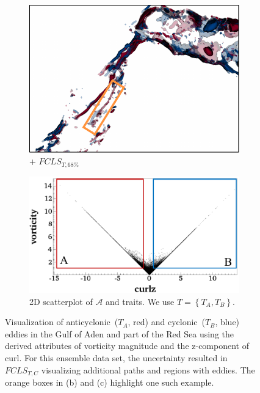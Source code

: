 \begin{figure}[!h]
\begin{subfigure}{0.245\linewidth}
\includegraphics[width=\linewidth]{Images/RedSeaEddy/fcls_68.pdf}
\vspace{-2mm}
\caption{+ $FCLS_{T,68\%}$}
\label{fig:rse_fcls}
\end{subfigure}
\hfill
\begin{subfigure}{0.24\linewidth}
\centering
\includegraphics[width=0.95\linewidth]{Images/RedSeaEddy/scatterplot.pdf}
\vspace{-2mm}
\caption{2D scatterplot of $\mathcal{A}$ and traits. We use $T = \left\{T_{A}, T_{B}\right\}$.} 
\label{fig:rse_scatterplot}
\end{subfigure}
\vspace{-2mm}
\caption{Visualization of anticyclonic~($T_{A}$, red) and cyclonic~($T_{B}$, blue) eddies in the Gulf of Aden and part of the Red Sea using the derived attributes of vorticity magnitude and the z-component of curl. For this ensemble data set, the uncertainty resulted in $FCLS_{T,C}$ visualizing additional paths and regions with eddies. The orange boxes in (b) and (c) highlight one such example.}
\label{fig:rse}
\end{figure}
